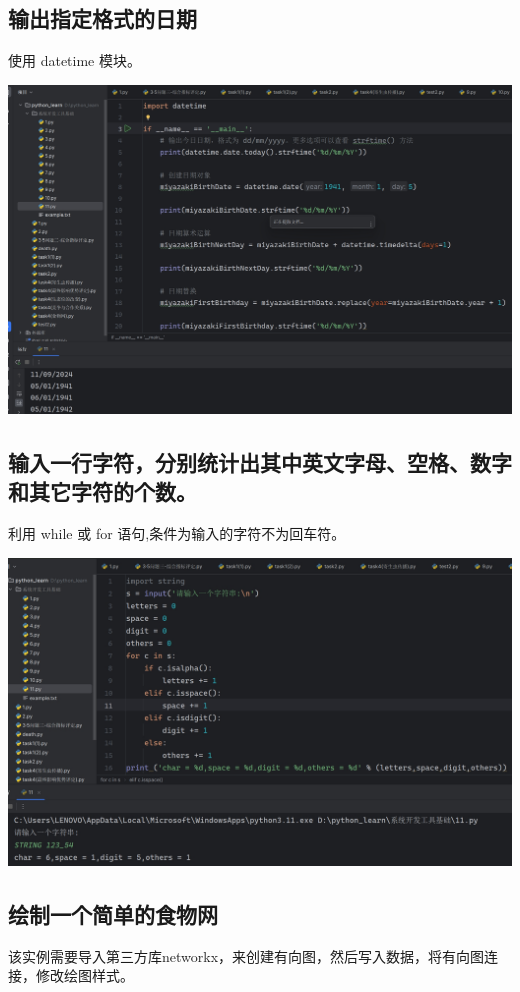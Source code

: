 \documentclass[UTF8,a4paper]{ctexart}
\begin{document}
\begin{sloppypar}
	\subsection{输出指定格式的日期}
	使用 datetime 模块。
	
	\includegraphics[width = 16cm]{26}
	
	\subsection{输入一行字符，分别统计出其中英文字母、空格、数字和其它字符的个数。}
	利用 while 或 for 语句,条件为输入的字符不为回车符。
	 
	\includegraphics[width = 14cm]{27}
	
	\subsection{绘制一个简单的食物网}
	该实例需要导入第三方库networkx，来创建有向图，然后写入数据，将有向图连接，修改绘图样式。
	

\end{sloppypar}
\end{document}

